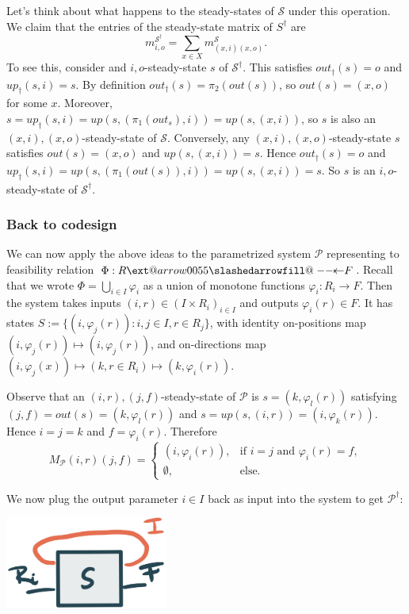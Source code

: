 \documentclass[12pt, a4paper]{article}
\makeatletter
\theoremstyle{definition}
\theoremstyle{plain}
\theoremstyle{plain}
\theoremstyle{plain}
\theoremstyle{plain}
\theoremstyle{plain}
\theoremstyle{remark}
\theoremstyle{remark}
\newcommand{\mc}[1]{\mathcal{#1}}
\def\slashedarrowfill@#1#2#3#4#5{%
	$\m@th\thickmuskip0mu\medmuskip\thickmuskip\thinmuskip\thickmuskip
	\relax#5#1\mkern-7mu%
	\cleaders\hbox{$#5\mkern-2mu#2\mkern-2mu$}\hfill
	\mathclap{#3}\mathclap{#2}%
	\cleaders\hbox{$#5\mkern-2mu#2\mkern-2mu$}\hfill
	\mkern-7mu#4$%
}
\def\leftslashedarrowfill@{%
	\slashedarrowfill@\relbar\relbar\mapstochar\leftarrow}
\newcommand\xslashedleftarrow[2][]{%
	\ext@arrow 0055{\leftslashedarrowfill@}{#1}{#2}}
\newcommand{\bprof}{\xslashedleftarrow{}}
\makeatother
\begin{document}
Let's think about what happens to the steady-states of $\mc{S}$ under this operation. We claim that the entries of the steady-state matrix of $S^\dagger$ are 
$$m^{\mc{S}^\dagger}_{i,o} = \sum_{x \in X} m^{\mc{S}}_{(x,i)(x,o)}.$$
To see this, consider and $i,o$-steady-state $s$ of $\mc{S}^\dagger$. This satisfies $out_\dagger(s) = o$ and $up_\dagger(s,i) = s$. By definition $out_\dagger(s) = \pi_2(out(s))$, so $out(s) = (x,o)$ for some $x$. Moreover, $s = up_\dagger(s,i) = up(s,(\pi_1(out_s),i)) = up(s,(x,i))$, so $s$ is also an $(x,i),(x,o)$-steady-state of $\mc{S}$. Conversely, any $(x,i),(x,o)$-steady-state $s$ satisfies $out(s) = (x,o)$ and $up(s,(x,i)) = s$. Hence $out_\dagger(s) = o$ and $up_\dagger(s,i) = up(s,(\pi_1(out(s)),i)) = up(s,(x,i)) = s$. So $s$ is an $i,o$-steady-state of $\mc{S}^\dagger$. 

\subsubsection{Back to codesign}
We can now apply the above ideas to the parametrized system $\mc{P}$ representing to feasibility relation $\Phi: R \bprof F$. Recall that we wrote $\Phi = \bigcup_{i \in I} \varphi_i$ as a union of monotone functions $\varphi_i \colon R_i \rightarrow F$. Then the system takes inputs $(i, r) \in (I \times R_i)_{i \in I}$ and outputs $\varphi_i(r) \in F$. It has states $S := \{ (i,\varphi_j(r)) : i,j \in I, r \in R_j \}$, with identity on-positions map $(i,\varphi_j(r)) \mapsto (i,\varphi_j(r))$, and on-directions map $(i,\varphi_j(x))\mapsto (k,r \in R_i) \mapsto (k,\varphi_i(r))$.

Observe that an $(i,r),(j,f)$-steady-state of $\mc{P}$ is $s = (k,\varphi_l(r))$ satisfying $(j,f) = out(s) = (k,\varphi_l(r))$ and $s = up(s,(i,r)) = (i,\varphi_k(r))$. Hence $i=j=k$ and $f = \varphi_i(r)$. Therefore
$$M_\mc{P}(i,r)(j,f) = \begin{cases} (i,\varphi_i(r)), & \text{if } i=j \text{ and } \varphi_i(r) = f, \\ \emptyset, & \text{else.} \end{cases} $$

We now plug the output parameter $i \in I$ back as input into the system to get $\mc{P}^\dagger$:
\begin{center}
	\includegraphics[width = 0.4\textwidth]{parameter-trace.jpg}
\end{center}
\end{document}
